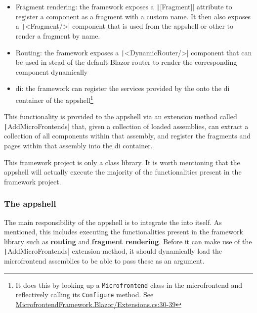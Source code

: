 \begin{itemize}
  \item Fragment rendering: the framework exposes a
  \texttt|[Fragment]| attribute to register a component as a
  fragment with a custom name. It then also exposes a
  \texttt|<Fragment/>| component that is used from the \gls{appshell}
  or other  to render a fragment by name.
  \item Routing: the framework exposes a \texttt|<DynamicRouter/>|
  component that can be used in stead of the default Blazor router to render the
  corresponding component dynamically
  \item \gls{di}: the framework can register the services provided by the
   onto the \gls{di} container of the
  \gls{appshell}\footnote{It does this by looking up a \texttt{Microfrontend}
  class in the \gls{microfrontend} and reflectively calling its
  \texttt{Configure} method. See
  \href{https://github.com/DanteDeRuwe/bachelor-thesis-code/blob/main/src/framework/MicrofrontendFramework.Blazor/Extensions.cs\#L30-L39}{MicrofrontendFramework.Blazor/Extensions.cs:30-39}}
\end{itemize}

This functionality is provided to the \gls{appshell} via an extension method
called \texttt|AddMicroFrontends| that, given a collection of loaded
assemblies, can extract a collection of all components within that assembly, and
register the fragments and pages within that assembly into the \gls{di}
container.

This framework project is only a class library. It is worth mentioning that the
\gls{appshell} will actually execute the majority of the functionalities present
in the framework project.

\subsubsection[The application shell]{The \gls{appshell}}

The main responsibility of the \gls{appshell} is to integrate the
 into itself. As mentioned, this includes executing the
functionalities present in the framework library such as \textbf{routing} and
\textbf{fragment rendering}. Before it can make use of the
\texttt|AddMicroFrontends| extension method, it should dynamically
load the microfrontend assemblies to be able to pass these as an argument.

